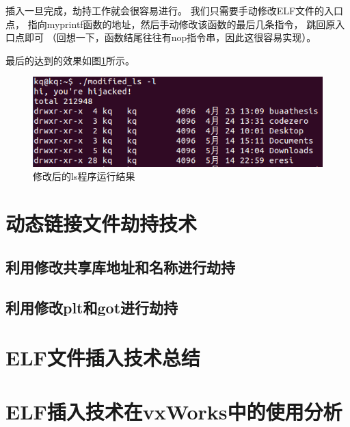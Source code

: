 插入一旦完成，劫持工作就会很容易进行。
我们只需要手动修改ELF文件的入口点，
指向myprintf函数的地址，然后手动修改该函数的最后几条指令，
跳回原入口点即可
（回想一下，函数结尾往往有nop指令串，因此这很容易实现）。

最后的达到的效果如图\ref{ls}所示。

\begin{figure}[h!]
    \centering
    \includegraphics[width=.6\textwidth]{figure/ls.png}
    \caption{修改后的ls程序运行结果}
    \label{ls}
\end{figure}





\section{动态链接文件劫持技术}

\subsection{利用修改共享库地址和名称进行劫持}

\subsection{利用修改plt和got进行劫持}

\section{ELF文件插入技术总结}

\section{ELF插入技术在vxWorks中的使用分析}

